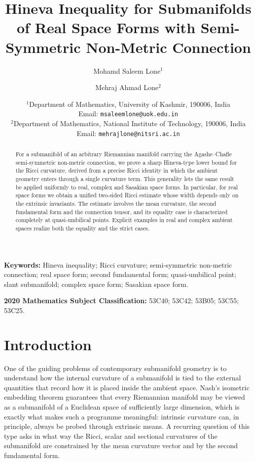 \documentclass[11pt]{article}
\theoremstyle{definition}
\begin{document}
\title{Hineva Inequality for Submanifolds of Real Space Forms with Semi-Symmetric Non-Metric Connection 	}
\author{Mohamd Saleem Lone$^{1}$ \and Mehraj Ahmad Lone$^{2}$}
\date{%
$^{1}$Department of Mathematics, University of Kashmir, 190006, India\\
Email: \texttt{msaleemlone@uok.edu.in}\\[2pt]
$^{2}$Department of Mathematics, National Institute of Technology, 190006, India\\
Email: \texttt{mehrajlone@nitsri.ac.in}}

\maketitle
 
\begin{abstract}
For a submanifold of an arbitrary Riemannian manifold carrying the Agashe–Chafle semi-symmetric non-metric connection, we prove a sharp Hineva-type lower bound for the Ricci curvature, derived from a precise Ricci identity in which the ambient geometry enters through a single curvature term. This generality lets the same result be applied uniformly to real, complex and Sasakian space forms. In particular, for real space forms we obtain a unified two-sided Ricci estimate whose width depends only on the extrinsic invariants. The estimate involves the mean curvature, the second fundamental form and the connection tensor, and its equality case is characterized completely at quasi-umbilical points. Explicit examples in real and complex ambient spaces realize both the equality and the strict cases.
\end{abstract}

\noindent\textbf{Keywords:} Hineva inequality; Ricci curvature; semi-symmetric non-metric connection; real space form; second fundamental form; quasi-umbilical point; slant submanifold; complex space form; Sasakian space form.

\medskip
\noindent\textbf{2020 Mathematics Subject Classification:} 53C40; 53C42; 53B05; 53C55; 53C25.

\section{Introduction}

One of the guiding problems of contemporary submanifold geometry is to understand how the internal curvature of a submanifold is tied to the external quantities that record how it is placed inside the ambient space. Nash's isometric embedding theorem \cite{Nash} guarantees that every Riemannian manifold may be viewed as a submanifold of a Euclidean space of sufficiently large dimension, which is exactly what makes such a programme meaningful: intrinsic curvature can, in principle, always be probed through extrinsic means. A recurring question of this type asks in what way the Ricci, scalar and sectional curvatures of the submanifold are constrained by the mean curvature vector and by the second fundamental form.
\end{document}
